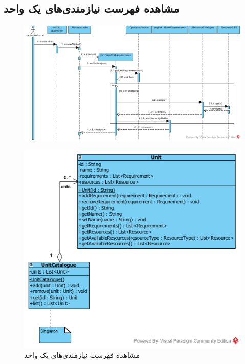 \begin{landscape}
\section{مشاهده فهرست نیازمندی‌های یک واحد}
\begin{figure}[H]
	\centering
	\includegraphics[scale=0.8]{img/sequence-design/ViewListOfRequirements}
\end{figure}
\begin{figure}[H]
	\centering
	\includegraphics[scale=0.7]{img/sequence-design/ViewListOfRequirementsC}
	\caption{مشاهده فهرست نیازمندی‌های یک واحد}
\end{figure}


\begin{landscape}

\end{landscape}
\end{landscape}
